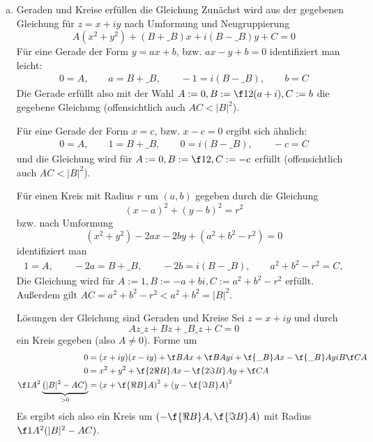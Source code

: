 \documentclass[a4paper]{scrartcl}
\begin{document}
	\newpage
	\begin{aufgabe}
		\begin{enumerate}[a)]
			\item 
				\begin{seg}{Geraden und Kreise erfüllen die Gleichung}
					Zunächst wird aus der gegebenen Gleichung für $z=x+iy$ nach Umformung und Neugruppierung
					\[
						A(x^2+y^2) + (B+\_B)x + i(B-\_B)y + C = 0
					\]
					Für eine Gerade der Form $y=ax+b$, bzw. $ax -y + b = 0$ identifiziert man leicht:
					\begin{align*}
						0 = A,\qquad a = B + \_B, \qquad -1 = i(B-\_B), \qquad b = C
					\end{align*}
					Die Gerade erfüllt also mit der Wahl $A:=0, B:=\f 12(a+i), C:= b$ die gegebene Gleichung (offensichtlich auch $AC<|B|^2$).
					
					Für eine Gerade der Form $x=c$, bzw. $x-c=0$ ergibt sich ähnlich:
					\begin{align*}
						0 = A,\qquad 1 = B + \_B, \qquad 0 = i(B-\_B), \qquad -c = C
					\end{align*}
					und die Gleichung wird für $A:=0, B:=\f 12, C:= -c$ erfüllt (offensichtlich auch $AC<|B|^2$).

					Für einen Kreis mit Radius $r$ um $(a,b)$ gegeben durch die Gleichung
					\[
						(x-a)^2 + (y-b)^2 = r^2
					\]
					bzw. nach Umformung
					\[
						(x^2+y^2) - 2ax - 2by +(a^2+b^2-r^2) = 0
					\]
					identifiziert man
					\begin{align*}
						1 = A,\qquad  -2a = B + \_B, \qquad -2b = i(B-\_B), \qquad a^2+b^2-r^2 = C,
					\end{align*}
					Die Gleichung wird für $A:=1, B:= -a +bi, C:=a^2+b^2-r^2$ erfüllt.
					Außerdem gilt $AC = a^2+b^2-r^2 < a^2+b^2 = |B|^2$.
				\end{seg}
				\begin{seg}{Lösungen der Gleichung sind Geraden und Kreise}
					Sei $z=x+iy$ und durch
					\[
						Az\_z + Bz + \_B\_z + C = 0
					\]
					ein Kreis gegeben (also $A\neq 0$).
					Forme um
					\begin{align*}
						0 &= (x+iy)(x-iy) + \f BA x + \f BA yi + \f{\_B}A x - \f{\_B}Ayi B \f CA\\
					    0 &= x^2+y^2 + \f {2 \Re B}A x - \f {2\Im B}A y + \f CA\\
						  \f 1{A^2}\underbrace{\left(|B|^2 - AC\right)}_{>0}&= \left(x+\f {\Re B}A\right)^2 + \left(y-\f {\Im B}A\right)^2  
					\end{align*}
					Es ergibt sich also ein Kreis um $( -\f{\Re B}A, \f {\Im B}A)$ mit Radius $\f 1{A^2}(|B|^2-AC)$.


\end{seg}
\end{enumerate}
\end{aufgabe}
\end{document}
